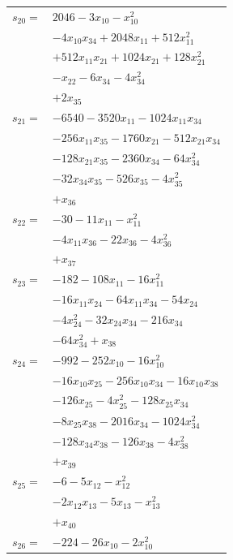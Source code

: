 \begin{longtable}{@{}r@{\;}l@{}}
\(s_{20}=\) & \(\displaystyle 2046 -3x_{10} -x_{10}^{2}\) \\
 & \(\displaystyle -4x_{10}x_{34} +2048x_{11} +512x_{11}^{2}\) \\
 & \(\displaystyle +512x_{11}x_{21} +1024x_{21} +128x_{21}^{2}\) \\
 & \(\displaystyle -x_{22} -6x_{34} -4x_{34}^{2}\) \\
 & \(\displaystyle +2x_{35}\) \\[3pt]
\(s_{21}=\) & \(\displaystyle -6540 -3520x_{11} -1024x_{11}x_{34}\) \\
 & \(\displaystyle -256x_{11}x_{35} -1760x_{21} -512x_{21}x_{34}\) \\
 & \(\displaystyle -128x_{21}x_{35} -2360x_{34} -64x_{34}^{2}\) \\
 & \(\displaystyle -32x_{34}x_{35} -526x_{35} -4x_{35}^{2}\) \\
 & \(\displaystyle +x_{36}\) \\[3pt]
\(s_{22}=\) & \(\displaystyle -30 -11x_{11} -x_{11}^{2}\) \\
 & \(\displaystyle -4x_{11}x_{36} -22x_{36} -4x_{36}^{2}\) \\
 & \(\displaystyle +x_{37}\) \\[3pt]
\(s_{23}=\) & \(\displaystyle -182 -108x_{11} -16x_{11}^{2}\) \\
 & \(\displaystyle -16x_{11}x_{24} -64x_{11}x_{34} -54x_{24}\) \\
 & \(\displaystyle -4x_{24}^{2} -32x_{24}x_{34} -216x_{34}\) \\
 & \(\displaystyle -64x_{34}^{2} +x_{38}\) \\[3pt]
\(s_{24}=\) & \(\displaystyle -992 -252x_{10} -16x_{10}^{2}\) \\
 & \(\displaystyle -16x_{10}x_{25} -256x_{10}x_{34} -16x_{10}x_{38}\) \\
 & \(\displaystyle -126x_{25} -4x_{25}^{2} -128x_{25}x_{34}\) \\
 & \(\displaystyle -8x_{25}x_{38} -2016x_{34} -1024x_{34}^{2}\) \\
 & \(\displaystyle -128x_{34}x_{38} -126x_{38} -4x_{38}^{2}\) \\
 & \(\displaystyle +x_{39}\) \\[3pt]
\(s_{25}=\) & \(\displaystyle -6 -5x_{12} -x_{12}^{2}\) \\
 & \(\displaystyle -2x_{12}x_{13} -5x_{13} -x_{13}^{2}\) \\
 & \(\displaystyle +x_{40}\) \\[3pt]
\(s_{26}=\) & \(\displaystyle -224 -26x_{10} -2x_{10}^{2}\) \\

\end{longtable}
